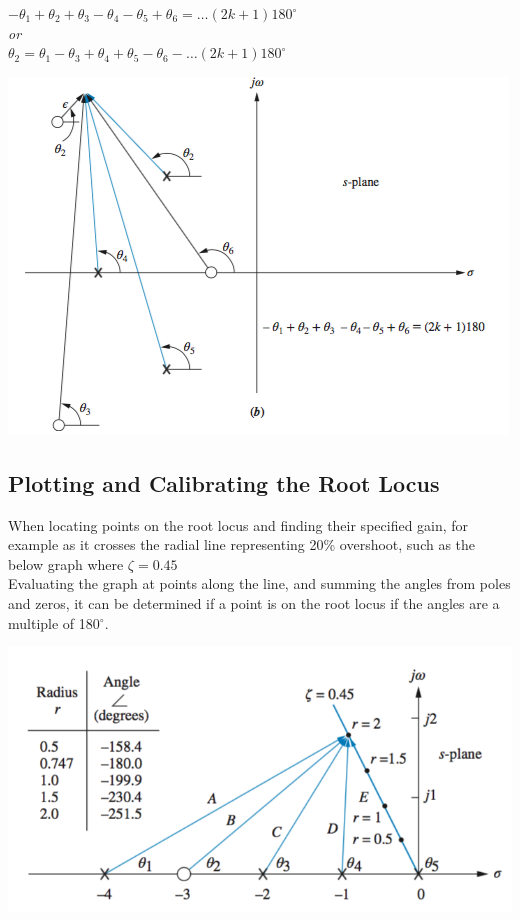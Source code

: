 \documentclass[11pt]{article}
\begin{document}
    $-\theta_1 + \theta_2 + \theta_3 - \theta_4 - \theta_5 + \theta_6 =(2k+1)180^\circ$ \\ 
    
    \textit{or} \\ 

    $\theta_2 = \theta_1 - \theta_3 + \theta_4 + \theta_5 - \theta_6 -(2k+1)180^\circ$ \\

    \begin{center}
        \includegraphics[width=300 px]{img/angles-zero} \\
    \end{center}  

    \subsection{Plotting and Calibrating the Root Locus}

    When locating points on the root locus and finding their specified gain, for example as it crosses the radial line representing 20\% overshoot, such as the below graph where $\zeta = 0.45$ \\ 

    Evaluating the graph at points along the line, and summing the angles from poles and zeros, it can be determined if a point is on the root locus if the angles are a multiple of 180$^\circ$.

    \begin{center}
        \includegraphics[width=300 px]{img/calibrating} \\
    \end{center}  
\end{document}
